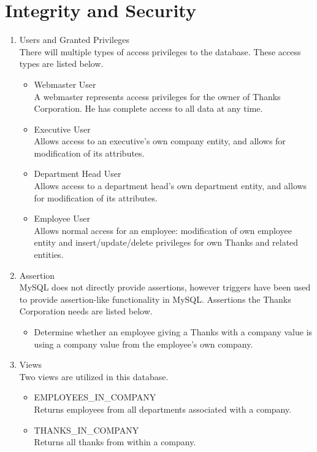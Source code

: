 \documentclass[11pt]{report}
\begin{document}
\section{Integrity and Security}
\begin{enumerate}
\item Users and Granted Privileges\\
There will multiple types of access privileges to the database. These access types are listed below.
    \begin{itemize}
    \item Webmaster User \\
    A webmaster represents access privileges for the owner of Thanks Corporation. He has complete access to all data at any time.
    \item Executive User \\
    Allows access to an executive's own company entity, and allows for modification of its attributes.
    \item Department Head User \\
    Allows access to a department head's own department entity, and allows for modification of its attributes.
    \item Employee User \\
    Allows normal access for an employee: modification of own employee entity and insert/update/delete privileges for own Thanks and related entities.
    \end{itemize}
\item Assertion \\
MySQL does not directly provide assertions, however triggers have been used to provide assertion-like functionality in MySQL. Assertions the Thanks Corporation needs are listed below.
    \begin{itemize}
    \item Determine whether an employee giving a Thanks with a company value is using a company value from the employee's own company.
    \end{itemize}
\item Views \\
Two views are utilized in this database.
    \begin{itemize}
    \item EMPLOYEES\_IN\_COMPANY \\
    Returns employees from all departments associated with a company.
    \item THANKS\_IN\_COMPANY \\
    Returns all thanks from within a company.
    \end{itemize}
\end{enumerate}
\clearpage
\end{document}
